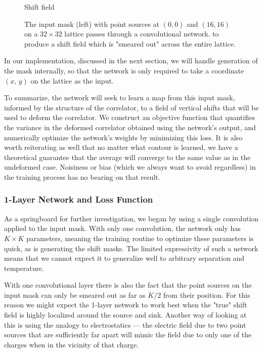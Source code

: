 \documentclass[12pt]{article}
\begin{document}
\begin{figure}[h]
\begin{minipage}{0.3\textwidth}
		\caption*{Shift field}
	\end{minipage}
	\caption[Input Mask and Output]{The input mask (left) with point sources at $(0,0)$ and $(16,16)$ on a $32\times 32$ lattice passes through a convolutional network. 
	to produce a shift field which is "smeared out" across the entire lattice.}
	\label{fig:mask_to_shift}
\end{figure}

In our implementation, discussed in the next section, we will handle generation of the mask internally, so that the network is only required to
take a coordinate $(x,\,y)$ on the lattice as the input. 

To summarize, the network will seek to learn a map from this input mask, informed by the structure of the correlator, to a field of vertical
shifts that will be used to deform the correlator. We construct an objective function that quantifies the variance in the deformed correlator
obtained using the network's output, and numerically optimize the network's weights by minimizing this loss. It is also worth reiterating as well that no matter what contour is learned, we have a theoretical
guarantee that the average will converge to the same value as in the undeformed case. Noisiness or bias (which we always want to avoid regardless) in the training process has no bearing on that result.

\subsubsection{1-Layer Network and Loss Function}

As a springboard for further investigation, we began by using a single convolution applied to the input mask. With only one convolution, the network
only has $K\times K$ parameters, meaning the training routine to optimize these parameters is quick, as is generating the shift masks. The limited
expressivity of such a network means that we cannot expect it to generalize well to arbitrary separation and temperature.

With one convolutional layer there is also the fact that the point sources on the input mask can only be smeared out as far as $K/2$ from their position.
For this reason we might expect the 1-layer network to work best when the "true" shift field is highly localized around the source and sink. Another way
of looking at this is using the analogy to electrostatics --- the electric field due to two point sources that are sufficiently far apart will mimic
the field due to only one of the charges when in the vicinity of that charge. 
\end{document}
